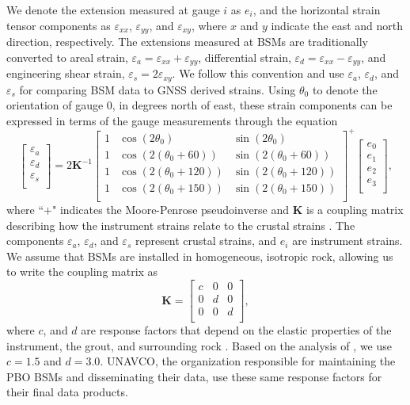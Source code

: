 We denote the extension measured at gauge $i$ as $e_i$, and the
horizontal strain tensor components as $\varepsilon_{xx}$,
$\varepsilon_{yy}$, and $\varepsilon_{xy}$, where $x$ and $y$ indicate
the east and north direction, respectively. The extensions measured at
BSMs are traditionally converted to areal strain, $\varepsilon_a =
\varepsilon_{xx} + \varepsilon_{yy}$, differential strain,
$\varepsilon_d = \varepsilon_{xx} - \varepsilon_{yy}$, and engineering
shear strain, $\varepsilon_s = 2\varepsilon_{xy}$. We follow this
convention and use $\varepsilon_a$, $\varepsilon_d$, and
$\varepsilon_s$ for comparing BSM data to GNSS derived strains. Using
$\theta_0$ to denote the orientation of gauge 0, in degrees north of
east, these strain components can be expressed in terms of the gauge
measurements through the equation
\begin{equation}\label{ch6:eq:GaugeToStrain}
\left[\begin{array}{c}
\varepsilon_a \\
\varepsilon_d \\
\varepsilon_s \\
\end{array}\right]
=
2\mathbf{K}^{-1}\left[\begin{array}{ccc}
1 & \cos(2\theta_0) & \sin(2\theta_0) \\
1 & \cos(2(\theta_0 + 60)) & \sin(2(\theta_0 + 60)) \\
1 & \cos(2(\theta_0 + 120)) & \sin(2(\theta_0 + 120)) \\
1 & \cos(2(\theta_0 + 150)) & \sin(2(\theta_0 + 150)) \\
\end{array}\right]^+
\left[\begin{array}{c}
e_0 \\
e_1 \\
e_2 \\
e_3 \\
\end{array}\right],
\end{equation} 
where ``$+$" indicates the Moore-Penrose pseudoinverse and
$\mathbf{K}$ is a coupling matrix describing how the instrument
strains relate to the crustal strains \citep{Hart1996}. The components
$\varepsilon_a$, $\varepsilon_d$, and $\varepsilon_s$ represent
crustal strains, and $e_i$ are instrument strains. We assume that BSMs
are installed in homogeneous, isotropic rock, allowing us to write the
coupling matrix as
\begin{equation}\label{ch6:eq:CouplingMatrix}
\mathbf{K} = 
\left[\begin{array}{ccc}
c & 0 & 0 \\
0 & d & 0 \\
0 & 0 & d \\
\end{array}\right],
\end{equation}  
where $c$, and $d$ are response factors that depend on the elastic
properties of the instrument, the grout, and surrounding rock
\citep{Gladwin1985}. Based on the analysis of \citet{Gladwin1985}, we
use $c=1.5$ and $d=3.0$. UNAVCO, the organization responsible for
maintaining the PBO BSMs and disseminating their data, use these same
response factors for their final data products.

